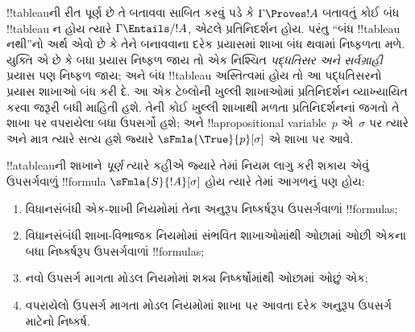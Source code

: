 \documentclass[../../../include/open-logic-section]{subfiles}
\begin{document}


\begin{explain}
  !!{tableau}ની રીત પૂર્ણ છે તે બતાવવા સાબિત કરવું પડે કે
  $\Gamma \Proves !A$ બતાવતું કોઈ બંધ !!{tableau} ન હોય ત્યારે
  $\Gamma \Entails/ !A$, એટલે પ્રતિનિદર્શન હોય. પરંતુ ``બંધ
  !!{tableau} નથી''નો અર્થ એવો છે કે તેને બનાવવાના દરેક પ્રયાસમાં
  શાખા બંધ થવામાં નિષ્ફળતા મળે. યુક્તિ એ છે કે બધા પ્રયાસ નિષ્ફળ
  જાય તો એક નિશ્ચિત \emph{પદ્ધતિસર અને સર્વગ્રાહી} પ્રયાસ પણ
  નિષ્ફળ જાય; અને બંધ !!{tableau} અસ્તિત્વમાં હોય તો આ
  પદ્ધતિસરનો પ્રયાસ શાખાઓ બંધ કરી દે. આ એક ટેબ્લોની ખુલ્લી
  શાખાઓમાં પ્રતિનિદર્શન વ્યાખ્યાયિત કરવા જરૂરી બધી માહિતી હશે.
  તેની કોઈ ખુલ્લી શાખાથી મળતા પ્રતિનિદર્શનનાં જગતો તે શાખા પર
  વપરાયેલા બધા ઉપસર્ગો હશે; અને !!a{propositional
    variable}~$p$ એ~$\sigma$ પર ત્યારે અને માત્ર ત્યારે સત્ય હશે
  જ્યારે $\sFmla{\True}{p}[\sigma]$ એ શાખા પર આવે.
\end{explain}

\begin{defn}
  !!a{tableau}ની શાખાને \emph{પૂર્ણ} ત્યારે કહીએ જ્યારે તેમાં
  નિયમ લાગુ કરી શકાય એવું ઉપસર્ગવાળું !!{formula}
  $\sFmla{S}{!A}[\sigma]$ હોય ત્યારે તેમાં આગળનું પણ હોય:
  \begin{enumerate}
    \item વિધાનસંબંધી એક-શાખી નિયમોમાં તેના અનુરૂપ નિષ્કર્ષરૂપ
      ઉપસર્ગવાળાં !!{formula}s;
    \item વિધાનસંબંધી શાખા-વિભાજક નિયમોમાં સંભવિત
      શાખાઓમાંથી ઓછામાં ઓછી એકના બધા નિષ્કર્ષરૂપ
      ઉપસર્ગવાળાં !!{formula}s;
    \item નવો ઉપસર્ગ માગતા મોડલ નિયમોમાં શક્ય નિષ્કર્ષોમાંથી
      ઓછામાં ઓછું એક;
    \item વપરાયેલો ઉપસર્ગ માગતા મોડલ નિયમોમાં શાખા પર આવતા
      દરેક અનુરૂપ ઉપસર્ગ માટેનો નિષ્કર્ષ.
  \end{enumerate}
\end{defn}
\end{document}

